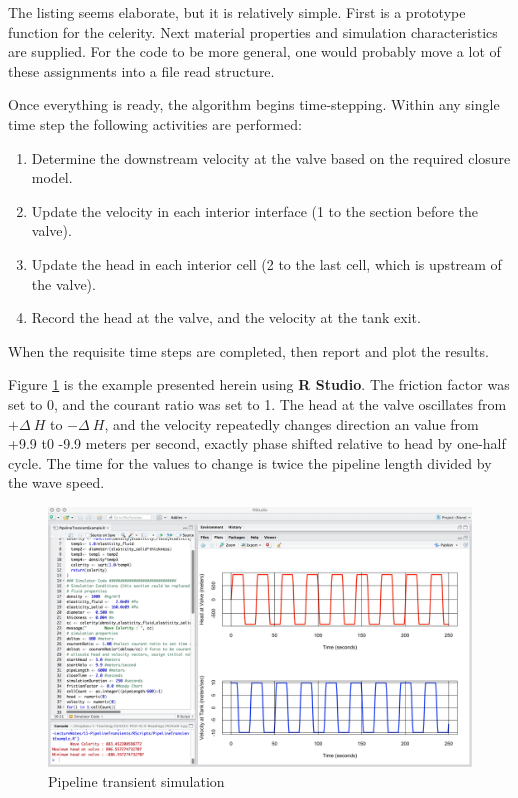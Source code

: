 The listing seems elaborate, but it is relatively simple.
First is a prototype function for the celerity. 
Next material properties and simulation characteristics are supplied.  
For the code to be more general, one would probably move a lot of these assignments into a file read structure.

Once everything is ready, the algorithm begins time-stepping. 
Within any single time step the following activities are performed:
\begin{enumerate}
\item Determine the downstream velocity at the valve based on the required closure model.
\item Update the velocity in each interior interface (1 to the section before the valve).
\item Update the head in each interior cell (2 to the last cell, which is upstream of the valve).
\item Record the head at the valve, and the velocity at the tank exit.
\end{enumerate}
 When the requisite time steps are completed, then report and plot the results.
 
Figure \ref{fig:PipelineExampleResult} is the example presented herein using \textbf{R Studio}.
The friction factor was set to 0, and the courant ratio was set to 1.
The head at the valve oscillates from $+\Delta~H$ to $-\Delta~H$, and the velocity repeatedly changes direction an value from +9.9 t0 -9.9 meters per second, exactly phase shifted relative to head by one-half cycle.
The time for the values to change is twice the pipeline length divided by the wave speed.

\begin{figure}[h!] %
   \centering
   \includegraphics[width=6in]{./11-PipelineTransients/ExampleResult.jpg} 
   \caption{Pipeline transient simulation}
   \label{fig:PipelineExampleResult}
\end{figure}

